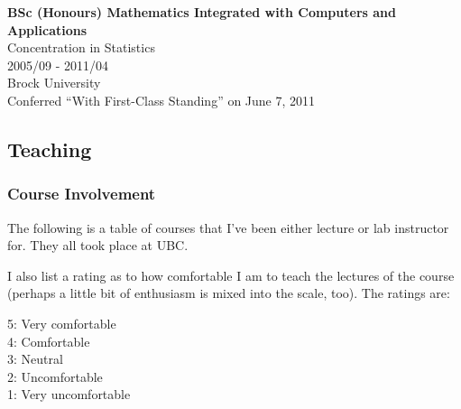 \documentclass[]{article}
\begin{document}
\textbf{BSc (Honours) Mathematics Integrated with Computers and Applications}\\
Concentration in Statistics\\
2005/09 - 2011/04\\
Brock University\\
Conferred ``With First-Class Standing'' on June 7, 2011

\hypertarget{teaching}{%
\subsection{Teaching}\label{teaching}}

\hypertarget{course-involvement}{%
\subsubsection{Course Involvement}\label{course-involvement}}

The following is a table of courses that I've been either lecture or lab instructor for. They all took place at UBC.

I also list a rating as to how comfortable I am to teach the lectures of the course (perhaps a little bit of enthusiasm is mixed into the scale, too). The ratings are:

5: Very comfortable\\
4: Comfortable\\
3: Neutral\\
2: Uncomfortable\\
1: Very uncomfortable
\end{document}
